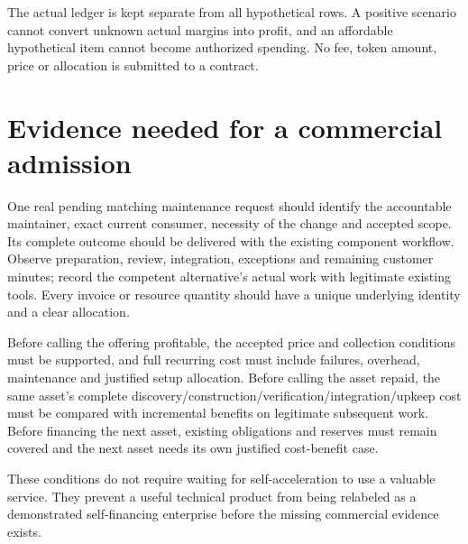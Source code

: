 \documentclass[11pt,letterpaper]{article}
\begin{document}
The actual ledger is kept separate from all hypothetical rows. A positive scenario cannot convert unknown actual margins into profit, and an affordable hypothetical item cannot become authorized spending. No fee, token amount, price or allocation is submitted to a contract.

\section{Evidence needed for a commercial admission}
One real pending matching maintenance request should identify the accountable maintainer, exact current consumer, necessity of the change and accepted scope. Its complete outcome should be delivered with the existing component workflow. Observe preparation, review, integration, exceptions and remaining customer minutes; record the competent alternative's actual work with legitimate existing tools. Every invoice or resource quantity should have a unique underlying identity and a clear allocation.

Before calling the offering profitable, the accepted price and collection conditions must be supported, and full recurring cost must include failures, overhead, maintenance and justified setup allocation. Before calling the asset repaid, the same asset's complete discovery/construction/verification/integration/upkeep cost must be compared with incremental benefits on legitimate subsequent work. Before financing the next asset, existing obligations and reserves must remain covered and the next asset needs its own justified cost-benefit case.

These conditions do not require waiting for self-acceleration to use a valuable service. They prevent a useful technical product from being relabeled as a demonstrated self-financing enterprise before the missing commercial evidence exists.
\end{document}
